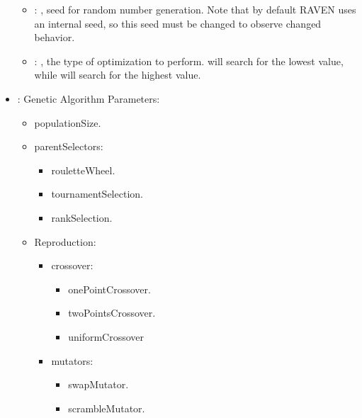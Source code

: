 \begin{itemize}
\begin{itemize}
        \item {}: , 
          seed for random number generation. Note that by default RAVEN uses an internal seed,
          so this seed must be changed to observe changed behavior. 

        \item {}: , 
          the type of optimization to perform.  will search for the lowest
           value, while  will search for the highest value.
      \end{itemize}

    \item {}:
      Genetic Algorithm Parameters:\begin{itemize}
      \item populationSize.                                                  \item parentSelectors:
      \begin{itemize}                                                                      \item
      rouletteWheel.                                                                      \item
      tournamentSelection.
      \item rankSelection.
      \end{itemize}                                                 \item Reproduction:
      \begin{itemize}                                                                    \item
      crossover:
      \begin{itemize}                                                                        \item
      onePointCrossover.
      \item twoPointsCrossover.
      \item uniformCrossover
      \end{itemize}                                                                    \item
      mutators:                                                                      \begin{itemize}
      \item swapMutator.
      \item scrambleMutator.

\end{itemize}
\end{itemize}
\end{itemize}
\end{itemize}
